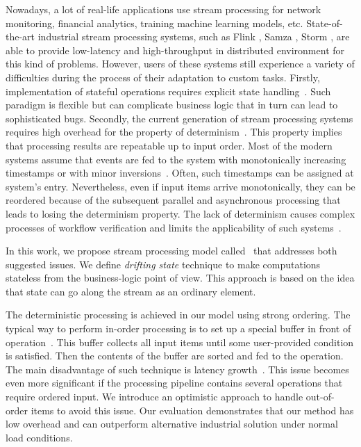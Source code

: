 
\label {fs-intro-seciton}

Nowadays, a lot of real-life applications use stream processing for network monitoring, financial analytics, training machine learning models, etc. State-of-the-art industrial stream processing systems, such as Flink \cite{carbone2015apache}, Samza \cite{Noghabi:2017:SSS:3137765.3137770}, Storm \cite{apache:storm}, are able to provide low-latency and high-throughput in distributed environment for this kind of problems. However, users of these systems still experience a variety of difficulties during the process of their adaptation to custom tasks. Firstly, implementation of stateful operations requires explicit state handling~\cite{apache:flink:state, apache:storm:state}. Such paradigm is flexible but can complicate business logic that in turn can lead to sophisticated bugs. Secondly, the current generation of stream processing systems requires high overhead for the property of determinism~\cite{Zacheilas:2017:MDS:3093742.3093921}. This property implies that processing results are repeatable up to input order. Most of the modern systems assume that events are fed to the system with monotonically increasing timestamps or with minor inversions~\cite{Wei:2009:SSO:1559845.1559973}. Often, such timestamps can be assigned at system's entry. Nevertheless, even if input items arrive monotonically, they can be reordered because of the subsequent parallel and asynchronous processing that leads to losing the determinism property. The lack of determinism causes complex processes of workflow verification and limits the applicability of such systems~\cite{Stonebraker:2005:RRS:1107499.1107504, Zacheilas:2017:MDS:3093742.3093921}.

In this work, we propose stream processing model called \FlameStream\ that addresses both suggested issues. We define {\it drifting state} technique to make computations stateless from the business-logic point of view. This approach is based on the idea that state can go along the stream as an ordinary element. 

The deterministic processing is achieved in our model using strong ordering. The typical way to perform in-order processing is to set up a special buffer in front of operation~\cite{Li:2008:OPN:1453856.1453890}. This buffer collects all input items until some user-provided condition is satisfied. Then the contents of the buffer are sorted and fed to the operation. The main disadvantage of such technique is latency growth~\cite{Zacheilas:2017:MDS:3093742.3093921}. This issue becomes even more significant if the processing pipeline contains several operations that require ordered input. We introduce an optimistic approach to handle out-of-order items to avoid this issue. Our evaluation demonstrates that our method has low overhead and can outperform alternative industrial solution under normal load conditions.


